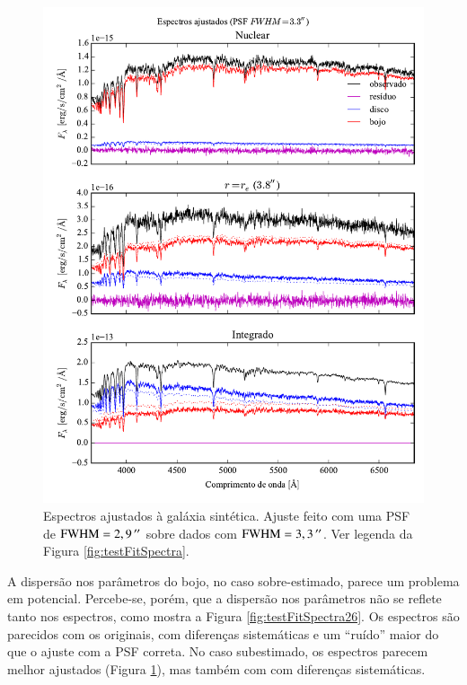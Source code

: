 \begin{figure}
	\includegraphics{figuras/simulation_spectra_psf33}
	\caption[Espectros ajustados (teste com PSF $\mathrm{FWHM} = 3,3\,\arcs$)]
	{Espectros ajustados à galáxia sintética. Ajuste feito com uma PSF de
	$\mathrm{FWHM} = 2,9\,^{\prime\prime}$ sobre dados com $\mathrm{FWHM} = 3,3\,\arcs$. Ver
	legenda da Figura \ref{fig:testFitSpectra}.} \label{fig:testFitSpectra33}
\end{figure}

A dispersão nos parâmetros do bojo, no caso sobre-estimado, parece um problema
em potencial. Percebe-se, porém, que a dispersão nos parâmetros não se reflete
tanto nos espectros, como mostra a Figura \ref{fig:testFitSpectra26}. Os
espectros são parecidos com os originais, com diferenças sistemáticas e um
``ruído'' maior do que o ajuste com a PSF correta. No caso subestimado, os
espectros parecem melhor ajustados (Figura \ref{fig:testFitSpectra33}), mas
também com com diferenças sistemáticas.

